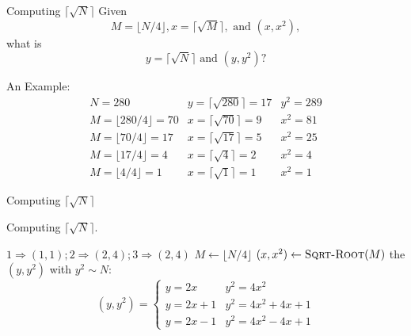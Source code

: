 \documentclass{beamer}
\begin{document}
\begin{frame}{Computing $\lceil \sqrt{N} \rceil$}
  Given
  \[ M = \lfloor N/4 \rfloor, x = \lceil \sqrt{M} \rceil,
    \textrm{ and } (x, x^2),
  \]
  what is
  \[ y = \lceil \sqrt{N} \rceil \textrm{ and } (y, y^2)? \]

  \begin{exampleblock}{An Example:}
  \[
  \begin{array}{lll}
    N = 280 & y = \lceil \sqrt{280} \rceil = 17 & y^2 = 289 \\
    M = \lfloor 280/4 \rfloor = 70 & x = \lceil \sqrt{70} \rceil = 9 & x^2 = 81
    \\
    M = \lfloor 70/4 \rfloor = 17 & x = \lceil \sqrt{17} \rceil = 5 & x^2 = 25
    \\
    M = \lfloor 17/4 \rfloor = 4 & x = \lceil \sqrt{4} \rceil = 2 & x^2 = 4
    \\
    M = \lfloor 4/4 \rfloor = 1 & x = \lceil \sqrt{1} \rceil = 1 & x^2 = 1
  \end{array}
  \]
  \end{exampleblock}
\end{frame}
\begin{frame}{Computing $\lceil \sqrt{N} \rceil$}
  \begin{algorithm}[H]
    \caption{Computing $\lceil \sqrt{N} \rceil$.}
    \begin{algorithmic}[]
	      \State \Return $1 \Rightarrow (1,1); 2 \Rightarrow (2,4); 3 \Rightarrow
	    (2,4)$
	    \EndIf
	    \State $M \gets \lfloor N/4 \rfloor$
	    \State $(x, x^2) \gets \textsc{Sqrt-Root}{(M)}$
		\State \Return the $(y, y^2)$ with $y^2 \sim N$:
           \[
			(y, y^2) = \left\{ \begin{array}{ll}
			y = 2x & y^2 = 4x^2 \\
			y = 2x + 1 & y^2 = 4x^2 + 4x + 1 \\
			y = 2x - 1 & y^2 = 4x^2 - 4x + 1
			\end{array} \right.
	      \]
	  \EndProcedure
    \end{algorithmic}
  \end{algorithm}
\end{frame}
\end{document}
